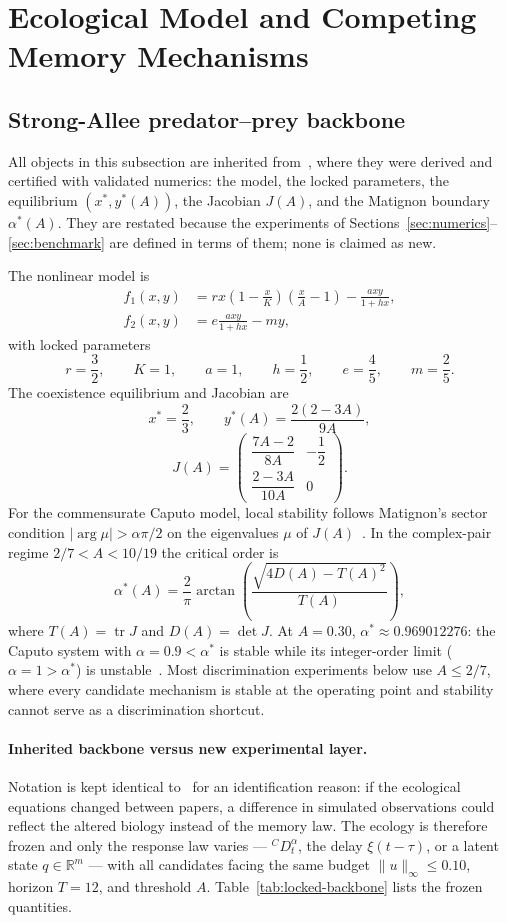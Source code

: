 \section{Ecological Model and Competing Memory Mechanisms}
\label{sec:model}

\subsection{Strong-Allee predator--prey backbone}
All objects in this subsection are inherited from~\cite{P01}, where they were derived and certified with validated numerics: the model, the locked parameters, the equilibrium $(x^*,y^*(A))$, the Jacobian $J(A)$, and the Matignon boundary $\alpha^*(A)$. They are restated because the experiments of Sections~\ref{sec:numerics}--\ref{sec:benchmark} are defined in terms of them; none is claimed as new.

The nonlinear model is
\begin{align}
 f_1(x,y) &= r x\left(1-\frac{x}{K}\right)\left(\frac{x}{A}-1\right)-\frac{axy}{1+hx},\\
 f_2(x,y) &= e\frac{axy}{1+hx}-my,
\end{align}
with locked parameters
\[
r=\frac32,\qquad K=1,\qquad a=1,\qquad h=\frac12,\qquad e=\frac45,\qquad m=\frac25.
\]
The coexistence equilibrium and Jacobian are
\[
x^*=\frac23,\qquad y^*(A)=\frac{2(2-3A)}{9A},
\]
\[
J(A)=\begin{pmatrix}
\dfrac{7A-2}{8A} & -\dfrac12\\[1ex]
\dfrac{2-3A}{10A} & 0
\end{pmatrix}.
\]
For the commensurate Caputo model, local stability follows Matignon's sector condition $|\arg\mu|>\alpha\pi/2$ on the eigenvalues $\mu$ of $J(A)$~\cite{F05}. In the complex-pair regime $2/7<A<10/19$ the critical order is
\[
\alpha^*(A)=\frac{2}{\pi}\arctan\!\left(\frac{\sqrt{4D(A)-T(A)^2}}{T(A)}\right),
\]
where $T(A)=\operatorname{tr}J$ and $D(A)=\det J$. At $A=0.30$, $\alpha^*\approx0.969012276$: the Caputo system with $\alpha=0.9<\alpha^*$ is stable while its integer-order limit ($\alpha=1>\alpha^*$) is unstable~\cite{P01}. Most discrimination experiments below use $A\le2/7$, where every candidate mechanism is stable at the operating point and stability cannot serve as a discrimination shortcut.

\paragraph{Inherited backbone versus new experimental layer.}
Notation is kept identical to~\cite{P01} for an identification reason: if the ecological equations changed between papers, a difference in simulated observations could reflect the altered biology instead of the memory law. The ecology is therefore frozen and only the response law varies --- ${}^CD_t^\alpha$, the delay $\xi(t-\tau)$, or a latent state $q\in\mathbb{R}^m$ --- with all candidates facing the same budget $\|u\|_\infty\le0.10$, horizon $T=12$, and threshold $A$. Table~\ref{tab:locked-backbone} lists the frozen quantities.

